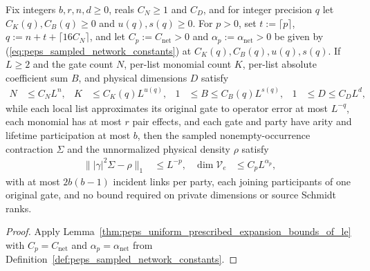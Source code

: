 \begin{lemma}
    \label{thm:peps_uniform_prescribed_expansion_bounds}
    \leanok
    Fix integers $b,r,n,d\ge0$, reals $C_N\ge1$ and $C_D$, and for integer precision $q$ let $C_K(q),C_B(q)\ge0$ and $u(q),s(q)\ge0$. For $p>0$, set $t:=\lceil p\rceil$, $q:=n+t+\lceil16C_N\rceil$, and let $C_p:=C_{\mathrm{net}}>0$ and $\alpha_p:=\alpha_{\mathrm{net}}>0$ be given by (\ref{eq:peps_sampled_network_constants}) at $C_K(q),C_B(q),u(q),s(q)$.
    If $L\ge2$ and the gate count $N$, per-list monomial count $K$, per-list absolute coefficient sum $B$, and physical dimensions $D$ satisfy
    \begin{align}
        N & \le C_NL^n,               &
        K & \le C_K(q)L^{u(q)},       &
        1 & \le B \le C_B(q)L^{s(q)}, &
        1 & \le D \le C_DL^d,
    \end{align}
    while each local list approximates its original gate to operator error at most $L^{-q}$, each monomial has at most $r$ pair effects, and each gate and party have arity and lifetime participation at most $b$, then the sampled nonempty-occurrence contraction $\Sigma$ and the unnormalized physical density $\rho$ satisfy
    \begin{align}
        \bigl\lVert |\gamma|^2\Sigma-\rho\bigr\rVert_1 & \le L^{-p},          &
        \dim\mathcal V_e                               & \le C_pL^{\alpha_p},
    \end{align}
    with at most $2b(b-1)$ incident links per party, each joining participants of one original gate, and no bound required on private dimensions or source Schmidt ranks.
\end{lemma}
\begin{proof}
    \leanok
    Apply Lemma~\ref{thm:peps_uniform_prescribed_expansion_bounds_of_le} with $C_p=C_{\mathrm{net}}$ and $\alpha_p=\alpha_{\mathrm{net}}$ from Definition~\ref{def:peps_sampled_network_constants}.
\end{proof}


